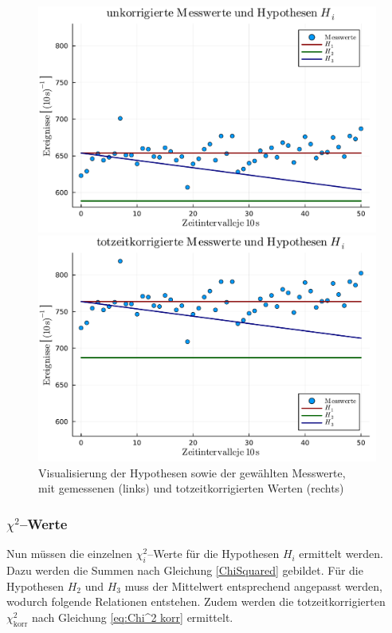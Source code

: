 \documentclass[12pt,a4paper]{scrartcl}
\numberwithin{equation}{section} %
\begin{document}
\begin{figure}[h!]
	\centering
	\begin{minipage}{0.49\textwidth}
		\includegraphics[width=\textwidth]{../media/B3.1/Hypothesen_plot.pdf}
	\end{minipage}
	\begin{minipage}{0.49\textwidth}
		\includegraphics[width=\textwidth]{../media/B3.1/Hypothesen_plot_corr.pdf}
	\end{minipage}
	\caption{Visualisierung der Hypothesen sowie der gewählten Messwerte,\\
		mit gemessenen (links) und totzeitkorrigierten Werten (rechts)}
	\label{abb:Hypothesen}
\end{figure}

\subsubsection{$\chi^2$--Werte}
Nun müssen die einzelnen $\chi^2_i$--Werte für die Hypothesen $H_i$ ermittelt werden. Dazu werden die Summen nach Gleichung \eqref{ChiSquared} gebildet. Für die Hypothesen $H_2$ und $H_3$ muss der Mittelwert entsprechend angepasst werden, wodurch folgende Relationen entstehen. Zudem werden die totzeitkorrigierten $\chi^2_\mathrm{korr}$ nach Gleichung \eqref{eq:Chi^2 korr} ermittelt.
\end{document}
